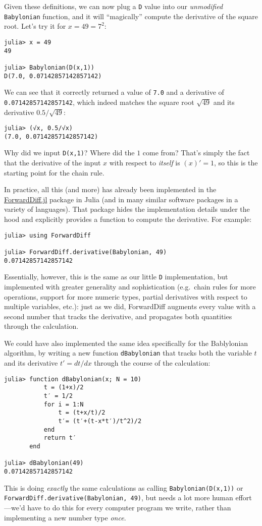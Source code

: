Given these definitions, we can now plug a \texttt{D} value into our \emph{unmodified} \texttt{Babylonian} function, and it will ``magically'' compute the derivative of the square root.  Let's try it for $x = 49 = 7^2$:
\begin{verbatim}
julia> x = 49
49

julia> Babylonian(D(x,1))
D(7.0, 0.07142857142857142)
\end{verbatim}
We can see that it correctly returned a value of \texttt{7.0} and a derivative of \texttt{0.07142857142857142}, which indeed matches the square root $\sqrt{49}$ and its derivative $0.5/\sqrt{49}$:
\begin{verbatim}
julia> (√x, 0.5/√x)
(7.0, 0.07142857142857142)
\end{verbatim}
Why did we input \texttt{D(x,1)}?  Where did the $1$ come from?   That's simply the fact that the derivative of the input $x$ with respect to \emph{itself} is $(x)' = 1$, so this is the starting point for the chain rule.

In practice, all this (and more) has already been implemented in the \href{https://github.com/JuliaDiff/ForwardDiff.jl}{ForwardDiff.jl} package in Julia (and in many similar software packages in a variety of languages).  That package hides the implementation details under the hood and explicitly provides a function to compute the derivative. For example:
\begin{verbatim}
julia> using ForwardDiff

julia> ForwardDiff.derivative(Babylonian, 49)
0.07142857142857142
\end{verbatim}
Essentially, however, this is the same as our little \texttt{D} implementation, but implemented with greater generality and sophistication (e.g.~chain rules for more operations, support for more numeric types, partial derivatives with respect to multiple variables, etc.): just as we did, ForwardDiff augments every value with a second number that tracks the derivative, and propagates both quantities through the calculation.

We could have also implemented the same idea specifically for the Bablylonian algorithm, by writing a new function \texttt{dBabylonian} that tracks both the variable $t$ and its derivative $t' = dt/dx$ through the course of the calculation:
\begin{verbatim}
julia> function dBabylonian(x; N = 10) 
           t = (1+x)/2
           t′ = 1/2
           for i = 1:N
               t = (t+x/t)/2
               t′= (t′+(t-x*t′)/t^2)/2
           end    
           return t′
       end

julia> dBabylonian(49)
0.07142857142857142
\end{verbatim}
This is doing \emph{exactly} the same calculations as calling \texttt{Babylonian(D(x,1))} or \texttt{ForwardDiff.derivative(Babylonian, 49)}, but needs a lot more human effort---we'd have to do this for every computer program we write, rather than implementing a new number type \emph{once}.

